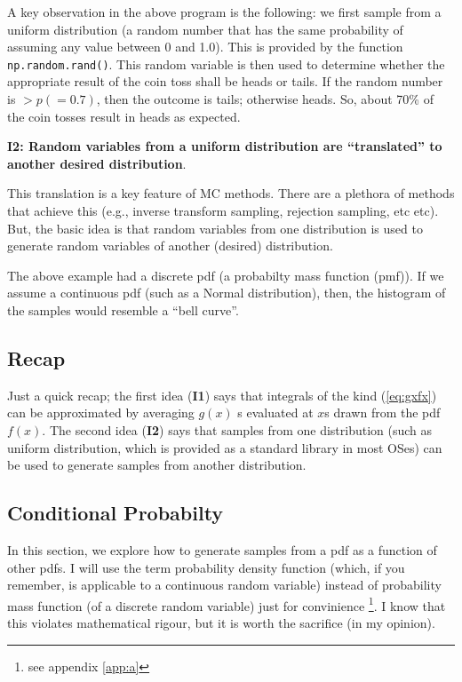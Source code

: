 \documentclass[11pt,onecolumn]{article}
\begin{document}
A key observation in the above program is the following: we first sample from a uniform distribution (a random number that has the same probability of assuming any value between 0 and 1.0). This is provided by the function {\texttt{np.random.rand()}}. This random variable is then used to determine whether the appropriate result of the coin toss shall be heads or tails. If the random number is $> p (= 0.7)$, then the outcome is tails; otherwise heads. So, about 70\% of the coin tosses result in heads as expected.

{\bf I2: Random variables from a uniform distribution are ``translated'' to another desired distribution}. 

This translation is a key feature of MC methods. There are a plethora of methods that achieve this (e.g., inverse transform sampling, rejection sampling, etc etc). But, the basic idea is that random variables from one distribution is used to generate random variables of another (desired) distribution.

The above example had a discrete pdf (a probabilty mass function (pmf)). If we assume a continuous pdf (such as a Normal distribution), then, the histogram of the samples would resemble a ``bell curve''.

\subsection{Recap}
Just a quick recap; the first idea ({\bf I1}) says that integrals of the kind (\ref{eq:gxfx}) can be approximated by averaging $g(x)$ s evaluated at $x$s drawn from the pdf $f(x)$. The second idea ({\bf I2}) says that samples from one distribution (such as uniform distribution, which is provided as a standard library in most OSes) can be used to generate samples from another distribution.

\subsection{Conditional Probabilty}
In this section, we explore how to generate samples from a pdf as a function of other pdfs. I will use the term probability density function (which, if you remember, is applicable to a continuous random variable) instead of probability mass function (of a discrete random variable) just for convinience \footnote{see appendix \ref{app:a}}. I know that this violates mathematical rigour, but it is worth the sacrifice (in my opinion). 
\end{document}
